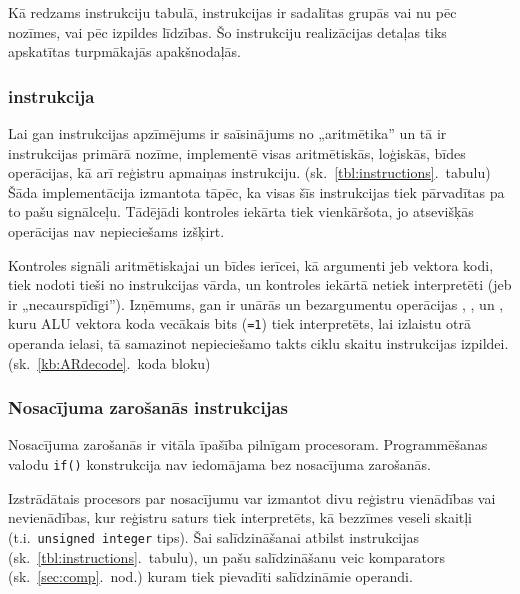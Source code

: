 \pagebreak
Kā redzams instrukciju tabulā, instrukcijas
ir sadalītas grupās vai nu pēc nozīmes, vai pēc izpildes līdzības. Šo
instrukciju realizācijas detaļas tiks apskatītas turpmākajās apakšnodaļās.

\subsubsection{ instrukcija} \label{sec:AR}
	Lai gan  instrukcijas apzīmējums ir saīsinājums no „aritmētika”
	un tā ir instrukcijas primārā nozīme,  implementē visas
	aritmētiskās, loģiskās, bīdes operācijas, kā arī reģistru 
	apmaiņas  instrukciju. (sk.~\ref{tbl:instructions}.~tabulu)
	Šāda implementācija izmantota tāpēc, ka visas šīs instrukcijas tiek
	pārvadītas pa to pašu signālceļu. Tādējādi kontroles iekārta tiek
	vienkāršota, jo atsevišķās operācijas nav nepieciešams izšķirt.
	
	Kontroles signāli aritmētiskajai un bīdes ierīcei,
	kā argumenti jeb vektora kodi,
	tiek nodoti tieši no instrukcijas vārda, un kontroles iekārtā netiek
	interpretēti (jeb ir „necaurspīdīgi”). Izņēmums, gan ir 
	unārās un bezargumentu operācijas
	, ,  un , kuru ALU
	vektora koda vecākais bits (\texttt{=1}) tiek interpretēts, lai izlaistu
	otrā operanda ielasi, tā samazinot nepieciešamo takts ciklu skaitu
	instrukcijas izpildei. (sk.~\ref{kb:ARdecode}.~koda bloku)
	
	\begin{singlespace}
		VHDL},%
		                caption={\mnem{AR} instrukcijas dekodēšana. (\texttt{control2.vhd})},%
		                label=kb:ARdecode,%
		                firstnumber=150]
			{code/gen/ardecode-snippet.vhd}
	\end{singlespace}


\subsubsection{Nosacījuma zarošanās instrukcijas} \label{sec:branching}
	Nosacījuma zarošanās ir vitāla īpašība pilnīgam procesoram. Programmēšanas
	valodu \texttt{if()} konstrukcija nav iedomājama bez
	nosacījuma zarošanās.
	
	Izstrādātais procesors par nosacījumu var izmantot divu reģistru
	vienā\-dības vai nevienādības, kur reģistru saturs tiek interpretēts, kā
	bezzīmes veseli skaitļi (t.i.~\texttt{unsigned~integer} tips).
	Šai salīdzināšanai atbilst  instrukcijas
	(sk.~\ref{tbl:instructions}.~tabulu), un pašu salīdzināšanu veic komparators
	(sk.~\ref{sec:comp}.~nod.) kuram tiek pievadīti salīdzināmie operandi.
	
